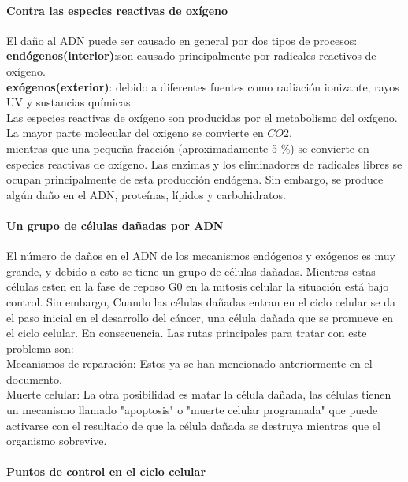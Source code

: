 \paragraph{Contra las especies reactivas de oxígeno}
El daño al ADN puede ser causado en general por dos tipos de procesos:\\
 \textbf{endógenos(interior)}:son causado principalmente por radicales reactivos de oxígeno.\\
 \textbf{exógenos(exterior)}: debido a diferentes fuentes como radiación ionizante, rayos UV y sustancias químicas.\\
Las especies reactivas de oxígeno  son producidas por el metabolismo del oxígeno. La mayor parte molecular del oxigeno se convierte en $CO2$.\\
mientras que una pequeña fracción (aproximadamente 5 \%) se convierte en especies reactivas de oxígeno. Las enzimas y los eliminadores de radicales libres se ocupan principalmente de esta producción endógena. Sin embargo, se produce algún daño en el ADN, proteínas, lípidos y carbohidratos\cite{Thormod}.

\paragraph{Un grupo de células dañadas por ADN}

El número de daños en el ADN de los mecanismos endógenos y exógenos es muy grande, y debido a esto se tiene un grupo de células dañadas. Mientras estas células esten en la fase de reposo G0 en la mitosis celular la situación está bajo control. Sin embargo, Cuando las células dañadas entran en el ciclo celular se da el paso inicial en el desarrollo del cáncer, una célula dañada que se promueve en el ciclo celular. En consecuencia. Las rutas principales para tratar con este problema son:\\
Mecanismos de reparación: Estos ya se han mencionado anteriormente en el documento.\\
Muerte celular: La otra posibilidad es matar la célula dañada, las células tienen un mecanismo llamado "apoptosis" o "muerte celular programada" que puede activarse con el resultado de que la célula dañada se destruya mientras que el organismo sobrevive\cite{Thormod}.

\paragraph{Puntos de control en el ciclo celular}

